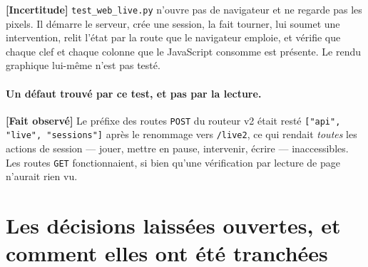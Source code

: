 \documentclass[11pt,a4paper]{article}
\newcommand{\code}[1]{\texttt{#1}}
\newcommand{\fait}{\textbf{[Fait observé]}}
\newcommand{\incertitude}{\textbf{[Incertitude]}}
\begin{document}
\incertitude{} \code{test\_web\_live.py} n'ouvre pas de navigateur et ne
regarde pas les pixels. Il démarre le serveur, crée une session, la fait
tourner, lui soumet une intervention, relit l'état par la route que le
navigateur emploie, et vérifie que chaque clef et chaque colonne que le
JavaScript consomme est présente. Le rendu graphique lui-même n'est pas testé.

\paragraph{Un défaut trouvé par ce test, et pas par la lecture.} \fait{} Le
préfixe des routes \code{POST} du routeur v2 était resté
\code{["api", "live", "sessions"]} après le renommage vers \code{/live2}, ce
qui rendait \emph{toutes} les actions de session --- jouer, mettre en pause,
intervenir, écrire --- inaccessibles. Les routes \code{GET} fonctionnaient, si
bien qu'une vérification par lecture de page n'aurait rien vu.

\section{Les décisions laissées ouvertes, et comment elles ont été tranchées}
\label{sec:decisions}
\end{document}
